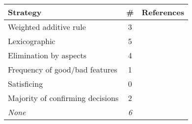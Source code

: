 
\begin{tabular}[c]{lcl}
\toprule
Strategy & \# & References\tabularnewline
\midrule
Weighted additive rule       & 3 & \citep{Amirkhanov:2010,Bergner:2013,Brecheisen:2009}\tabularnewline
Lexicographic & 5 & \citep{Afzal:2011,Berger:2011,Luboschik:2014,Marks:1997,Torsney-Weir:2011}\tabularnewline
Elimination by aspects & 4 & \citep{Booshehrian:2012,Matkovic:2009,Spence:1995,Waser:2010}\tabularnewline
Frequency of good/bad features & 1 & \citep{Coffey:2013}\tabularnewline
Satisficing & 0 & \tabularnewline
Majority of confirming decisions & 2 & \citep{Bruckner:2010,Pretorius:2011}\tabularnewline
\textit{None} & \textit{6} & \textit{\citep{Guo:2009,Konyha:2006,Matkovic:2008,Piringer:2010,Potter:2009,Unger:2012}}\tabularnewline
\bottomrule
\end{tabular}
